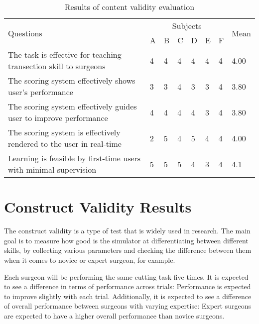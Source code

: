 \begin{table}
\small
\centering
\begin{tabular}{p{6cm}p{0.5cm}p{0.5cm}p{0.5cm}p{0.5cm}p{0.5cm}p{0.5cm}p{0.8cm}}
  \multirow{2}{4em}{Questions} & \multicolumn{6}{c}{Subjects} & \multirow{2}{4em}{Mean} \\
  \cmidrule{2-7}
  & A & B & C & D & E & F &\\
  \toprule
  The task is effective for teaching transection skill to surgeons
  & 4& 4& 4& 4 & 4& 4 & 4.00\\
  \midrule
  The scoring system effectively shows user's performance
  & 3& 3& 4 & 3 & 3 & 4 & 3.80\\
  \midrule
  The scoring system effectively guides user to improve performance
  & 4 & 4 & 4& 4& 3 & 4 & 3.80\\
  \midrule
  The scoring system is effectively rendered to the user in real-time
  & 2 & 5 & 4& 5& 4 & 4 & 4.00\\
  \midrule
  Learning is feasible by first-time users with minimal supervision & 5 & 5 & 5 & 4 & 3& 4 & 4.1\\
  \bottomrule
\end{tabular}
\caption{Results of content validity evaluation}\label{tab:contentTable2}
\end{table}

\section{Construct Validity Results}\label{sec:construct}

The construct validity is a type of test that is widely used in research. The main goal is to measure how good is the simulator at differentiating between different skills, by collecting various parameters and checking the difference between them when it comes to novice or expert surgeon, for example.

Each surgeon will be performing the same cutting task five times. It is expected to see a difference in terms of performance across trials: Performance is expected to improve slightly with each trial. Additionally, it is expected to see a difference of overall performance between surgeons with varying expertise: Expert surgeons are expected to have a higher overall performance than novice surgeons.


